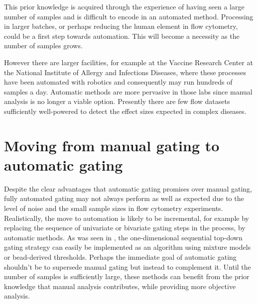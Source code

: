 This prior knowledge is acquired through the experience of having seen a large number of samples and is difficult to encode in an automated method.
Processing in larger batches, or perhaps reducing the human element in flow cytometry, could be a first step towards automation.
This will become a necessity as the number of samples grows.

However there are larger facilities, for example at the Vaccine Research Center at the National Institute of Allergy and Infections Diseases, where these processes have been automated with robotics and consequently may run hundreds of samples a day.
Automatic methods are more pervasive in those labs since manual analysis is no longer a viable option.
Presently there are few flow datasets sufficiently well-powered to detect the effect sizes expected in complex diseases.


\section{ Moving from manual gating to automatic gating }

Despite the clear advantages that automatic gating promises over manual gating, fully automated gating may not always perform as well as expected due to the level of noise and the small sample sizes in flow cytometry experiments.
Realistically, the move to automation is likely to be incremental, for example by replacing the sequence of univariate or bivariate gating steps in the process, by automatic methods.
As was seen in , the one-dimensional sequential top-down gating strategy can easily be implemented as an algorithm using mixture models or bead-derived thresholds.  
Perhaps the immediate goal of automatic gating shouldn't be to supersede manual gating but instead to complement it.
Until the number of samples is sufficiently large, these methods can benefit from the prior knowledge that manual analysis contributes, while providing more objective analysis.

